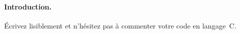 \documentclass[ds]{sujet}
\begin{document}
\matiere{}  
\auteur{} 
\paragraph{Introduction.}
\'Ecrivez lisiblement et n'h\'esitez  pas \`a commenter votre code  en
langage~C. 



\end{document}
